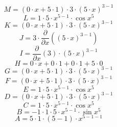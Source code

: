 \documentclass[12pt]{article}
\begin{document}
\begin{equation}
	M = 
\left( 0\cdot x + 5\cdot 1\right) \cdot 3\cdot \left( 5\cdot x\right) ^{3 - 1}
\end{equation}
\begin{equation}
	L = 
1\cdot 5\cdot x^{5 - 1}\cdot \cos {x^{5}}
\end{equation}
\begin{equation}
	K = 
\left( 0\cdot x + 5\cdot 1\right) \cdot 3\cdot \left( 5\cdot x\right) ^{3 - 1}
\end{equation}
\begin{equation}
	J = 
3\cdot \frac{\partial}{\partial x}\left( \left( 5\cdot x\right) ^{3 - 1}\right) 
\end{equation}
\begin{equation}
	I = 
\frac{\partial}{\partial x}\left( 3\right) \cdot \left( 5\cdot x\right) ^{3 - 1}
\end{equation}
\begin{equation}
	H = 
0\cdot x + 0\cdot 1 + 0\cdot 1 + 5\cdot 0
\end{equation}
\begin{equation}
	G = 
\left( 0\cdot x + 5\cdot 1\right) \cdot 3\cdot \left( 5\cdot x\right) ^{3 - 1}
\end{equation}
\begin{equation}
	F = 
\left( 0\cdot x + 5\cdot 1\right) \cdot 3\cdot \left( 5\cdot x\right) ^{3 - 1}
\end{equation}
\begin{equation}
	E = 
1\cdot 5\cdot x^{5 - 1}\cdot \cos {x^{5}}
\end{equation}
\begin{equation}
	D = 
\left( 0\cdot x + 5\cdot 1\right) \cdot 3\cdot \left( 5\cdot x\right) ^{3 - 1}
\end{equation}
\begin{equation}
	C = 
1\cdot 5\cdot x^{5 - 1}\cdot \cos {x^{5}}
\end{equation}
\begin{equation}
	B = 
-1\cdot 1\cdot 5\cdot x^{5 - 1}\cdot \sin {x^{5}}
\end{equation}
\begin{equation}
	A = 
5\cdot 1\cdot \left( 5 - 1\right) \cdot x^{5 - 1 - 1}
\end{equation}
\end{document}
